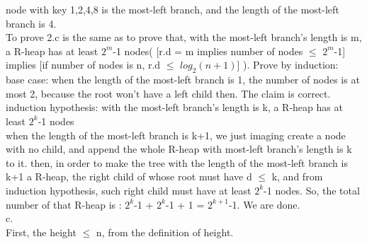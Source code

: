 \documentclass{article}
\begin{document}
node with key 1,2,4,8 is the most-left branch, and the length of the most-left branch is 4.\\
To prove 2.c is the same as to prove that, with the most-left branch's length is m, a R-heap has at least $2^m$-1 nodes( [r.d = m implies number of nodes $\leq$ $2^m$-1] implies [if number of nodes is n, r.d $\leq$ $log_2 (n+1)$] ).
Prove by induction:\\
base case: when the length of the most-left branch is 1, the number of nodes is at most 2, because the root won't have a left child then. The claim is correct.\\
induction hypothesis: with the most-left branch's length is k, a R-heap has at least $2^k$-1 nodes\\
when the length of the most-left branch is k+1, we just imaging create a node with no child, and append the whole R-heap with most-left branch's length is k to it. then, in order to make the tree with the length of the most-left branch is k+1 a R-heap, the right child of whose root must have d $\leq$ k, and from induction hypothesis, such right child must have at least $2^k$-1 nodes. So, the total number of that R-heap is : $2^k$-1 + $2^k$-1 + 1 = $2^{k+1}$-1. We are done.
\\c.\\
First, the height $\leq$ n, from the definition of height.
\end{document}
